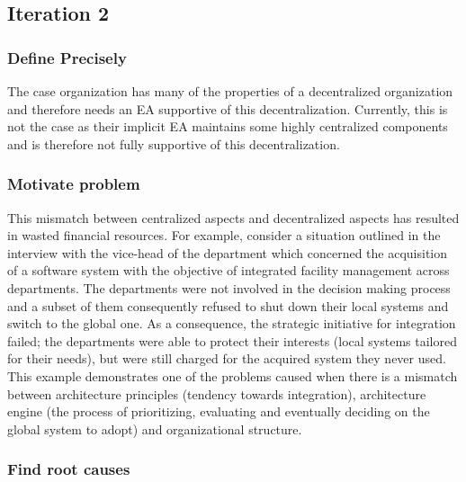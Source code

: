 



\subsection{Iteration 2}
\label{sec:explicate_iteration2}

\subsubsection*{Define Precisely}

The case organization has many of the properties of a decentralized organization and therefore needs an EA supportive of this decentralization. Currently, this is not the case as their implicit EA maintains some highly centralized components and is therefore not fully supportive of this decentralization. 


\subsubsection*{Motivate problem}

This mismatch between centralized aspects and decentralized aspects has resulted in wasted financial resources. For example, consider a situation outlined in the interview with the vice-head of the department which concerned the acquisition of a software system with the objective of integrated facility management across departments. The departments were not involved in the decision making process and a subset of them consequently refused to shut down their local systems and switch to the global one. As a consequence, the strategic initiative for integration failed; the departments were able to protect their interests (local systems tailored for their needs), but were still charged for the acquired system they never used. This example demonstrates one of the problems caused when there is a mismatch between architecture principles (tendency towards integration), architecture engine (the process of prioritizing, evaluating and eventually deciding on the global system to adopt) and organizational structure.

\subsubsection*{Find root causes}


